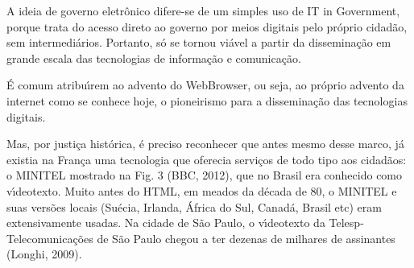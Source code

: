 \documentclass[
12pt,		%
openright,	%
twoside,  %
a4paper,			%
chapter=TITLE,		%
english,			%
french,				%
spanish,			%
brazil				%
]{USPSC-classe/USPSC}
\begin{document}
A ideia de governo eletr\^onico difere-se de um simples uso de \textquotedbl IT in Government\textquotedbl , porque trata do acesso direto ao governo por meios digitais pelo pr\'oprio cidad\~ao, sem intermedi\'arios. Portanto, s\'o se tornou vi\'avel a partir da dissemina\c{c}\~ao em grande escala das tecnologias de informa\c{c}\~ao e comunica\c{c}\~ao.

















\'E comum atribu\'{\i}rem ao advento do WebBrowser, ou seja, ao pr\'oprio advento da internet como se conhece hoje, o pioneirismo para a dissemina\c{c}\~ao das tecnologias digitais.

















Mas, por justi\c{c}a hist\'orica, \'e preciso reconhecer que antes mesmo desse marco, j\'a existia na Fran\c{c}a uma tecnologia que oferecia servi\c{c}os de todo tipo aos cidad\~aos: o MINITEL mostrado na Fig. 3 (BBC, 2012), que no Brasil era conhecido como v\'{\i}deotexto. Muito antes do HTML, em meados da d\'ecada de 80, o MINITEL e suas vers\~oes locais (Su\'ecia, Irlanda, \'Africa do Sul, Canad\'a, Brasil etc) eram extensivamente usadas. Na cidade de S\~ao Paulo, o v\'{\i}deotexto da Telesp- Telecomunica\c{c}\~oes de S\~ao Paulo chegou a ter dezenas de milhares de assinantes  (Longhi, 2009).
\end{document}
